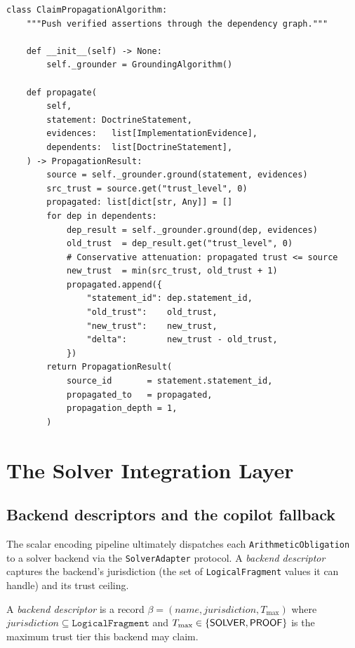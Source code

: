 \documentclass[11pt]{article}
\newcommand{\PropAlg}{\textsc{ClaimProp}}    %
\begin{document}
\begin{lstlisting}[style=jugeo-python,
  caption={\PropAlg{} class.},
  label={lst:prop}]
class ClaimPropagationAlgorithm:
    """Push verified assertions through the dependency graph."""

    def __init__(self) -> None:
        self._grounder = GroundingAlgorithm()

    def propagate(
        self,
        statement: DoctrineStatement,
        evidences:   list[ImplementationEvidence],
        dependents:  list[DoctrineStatement],
    ) -> PropagationResult:
        source = self._grounder.ground(statement, evidences)
        src_trust = source.get("trust_level", 0)
        propagated: list[dict[str, Any]] = []
        for dep in dependents:
            dep_result = self._grounder.ground(dep, evidences)
            old_trust  = dep_result.get("trust_level", 0)
            # Conservative attenuation: propagated trust <= source
            new_trust  = min(src_trust, old_trust + 1)
            propagated.append({
                "statement_id": dep.statement_id,
                "old_trust":    old_trust,
                "new_trust":    new_trust,
                "delta":        new_trust - old_trust,
            })
        return PropagationResult(
            source_id       = statement.statement_id,
            propagated_to   = propagated,
            propagation_depth = 1,
        )
\end{lstlisting}

\section{The Solver Integration Layer}\label{sec:solver}

\subsection{Backend descriptors and the copilot fallback}

The scalar encoding pipeline ultimately dispatches each
\texttt{ArithmeticObligation} to a solver backend via the
\texttt{SolverAdapter} protocol.
A \emph{backend descriptor} captures the backend's jurisdiction
(the set of \texttt{LogicalFragment} values it can handle) and
its trust ceiling.

\begin{definition}\label{def:backend}
A \emph{backend descriptor} is a record
$\beta = (\mathit{name}, \mathit{jurisdiction}, T_{\max})$ where
$\mathit{jurisdiction} \subseteq \mathtt{LogicalFragment}$ and
$T_{\max} \in \{\mathsf{SOLVER}, \mathsf{PROOF}\}$ is the maximum trust tier
this backend may claim.
\end{definition}
\end{document}
